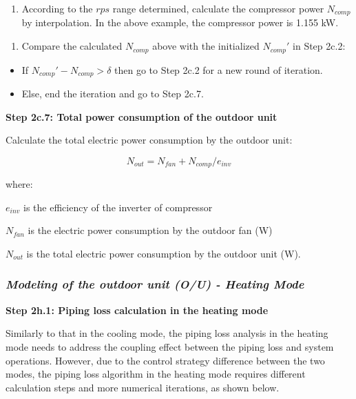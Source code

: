\begin{enumerate}
\def\labelenumi{\alph{enumi}.}
\setcounter{enumi}{1}
\tightlist
\item
  According to the \(rps\) range determined, calculate the compressor power \(N_{comp}\) by interpolation. In the above example, the compressor power is 1.155 kW. 
\end{enumerate}

\begin{enumerate}
\def\labelenumi{(\arabic{enumi})}
\setcounter{enumi}{1}
\tightlist
\item
  Compare the calculated \(N_{comp}\) above with the initialized \({N_{comp}}'\) in Step 2c.2:
\end{enumerate}

\begin{itemize}
\item
  If \({N_{comp}}'-N_{comp}>\delta\) then go to Step 2c.2 for a new round of iteration.
\item
  Else, end the iteration and go to Step 2c.7.
\end{itemize}

\textbf{Step 2c.7: Total power consumption of the outdoor unit}\label{step-2c.7-total-power-consumption-of-the-outdoor-unit}

Calculate the total electric power consumption by the outdoor unit:

\begin{equation}
N_{out} = N_{fan}+N_{comp}/e_{inv}
\end{equation}

where:

\(e_{inv}\) is the efficiency of the inverter of compressor

\(N_{fan}\) is the electric power consumption by the outdoor fan (W)

\(N_{out}\) is the total electric power consumption by the outdoor unit (W).

\subsubsection{\emph{Modeling of the outdoor unit (O/U) - Heating Mode}}\label{modeling-of-the-outdoor-unit-ou---heating-mode}

\textbf{Step 2h.1: Piping loss calculation in the heating mode} 

Similarly to that in the cooling mode, the piping loss analysis in the heating mode needs to address the coupling effect between the piping loss and system operations. However, due to the control strategy difference between the two modes, the piping loss algorithm in the heating mode requires different calculation steps and more numerical iterations, as shown below.

